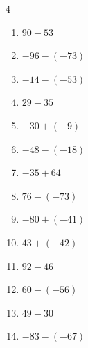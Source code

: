 


\setcounter{quesnum}{76}

\begin{multicols}{4}
\begin{enumerate}
  \itemsep=1pt
  \item $90-53$

        \phantom{$=37$}

  \item $-96-(-73)$

        \phantom{$=-23$}

  \item $-14-(-53)$

        \phantom{$=39$}

  \item $29-35$

        \phantom{$=-6$}

  \item $-30+(-9)$

        \phantom{$=-39$}

  \item $-48-(-18)$

        \phantom{$=-30$}

  \item $-35+64$

        \phantom{$=29$}

  \item $76-(-73)$

        \phantom{$=149$}

  \item $-80+(-41)$

        \phantom{$=-121$}

  \item $43+(-42)$

        \phantom{$=1$}

  \item $92-46$

        \phantom{$=46$}

  \item $60-(-56)$

        \phantom{$=116$}

  \item $49-30$

        \phantom{$=19$}

  \item $-83-(-67)$

        \phantom{$=-16$}


\end{enumerate}
\end{multicols}

